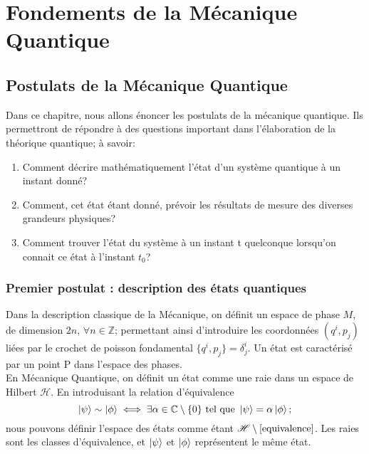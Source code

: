 \documentclass[../notesdecours.tex]{subfiles}
\begin{document}
    \part{Fondements de la Mécanique Quantique}

    \chapter{Postulats de la Mécanique Quantique}

    Dans ce chapitre, nous allons énoncer les postulats de la mécanique quantique. Ils permettront de répondre à des questions important dans l'élaboration de la théorique quantique; à savoir:
    \begin{enumerate}
    \item Comment décrire mathématiquement l'état d'un système quantique à un instant donné?
    \item Comment, cet état étant donné, prévoir les résultats de mesure des diverses grandeurs physiques?
    \item Comment trouver l'état du système à un instant t quelconque lorsqu'on connait  ce état à l'instant $t_0$?
    \end{enumerate}

    \section{Premier postulat : description des états quantiques}

    Dans la description classique de la Mécanique, on définit un espace de phase $M$, de dimension $2n$, $\forall n\in\mathbb{Z}$; permettant ainsi d'introduire les coordonnées $\left(q^i,p_j\right)$ liées par le crochet de poisson fondamental $\{q^i,p_j\}=\delta^i_j$. Un état est caractérisé par un point P dans l'espace des phases.\\

    En Mécanique Quantique, on définit un état comme une raie dans un espace de Hilbert $\mathcal{H}$. En introduisant la relation d'équivalence
    \begin{equation}
    \label{eq:equivalence}
        \ket{\psi} \sim \ket{\phi} \iff \exists \alpha\in\mathbb{C}\setminus\{0\} \text{ tel que } \ket{\psi}=\alpha\ket{\phi} ;
    \end{equation}
    nous pouvons définir l'espace des états comme étant $\mathcal{H}\setminus\ref{equivalence}$. Les raies sont les classes d'équivalence, et $\ket{\psi}$ et $\ket{\phi}$ représentent le même état.\\
\end{document}
